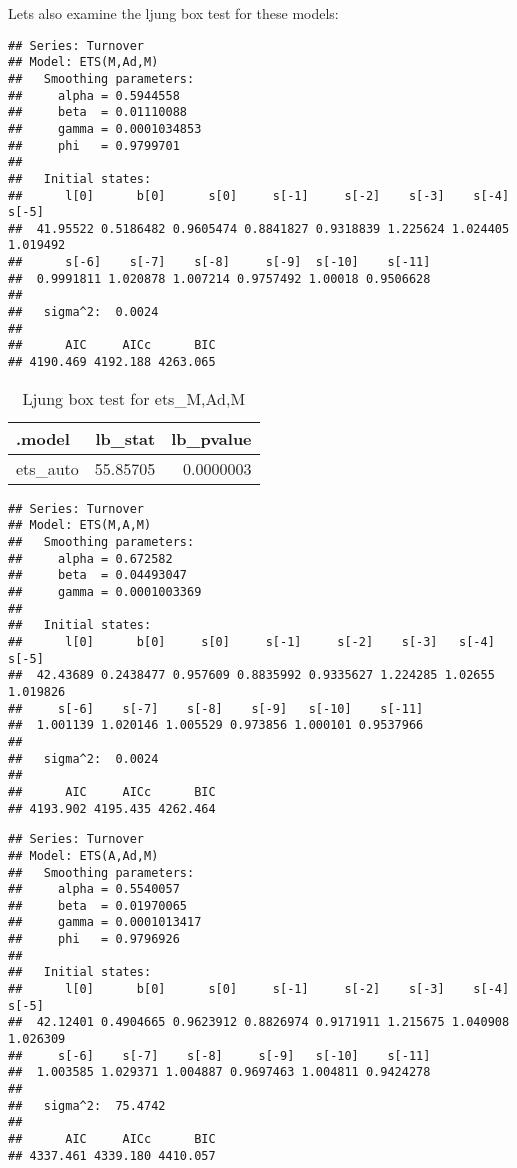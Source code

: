 \documentclass[
]{article}
\begin{document}
Lets also examine the ljung box test for these models:

\begin{verbatim}
## Series: Turnover 
## Model: ETS(M,Ad,M) 
##   Smoothing parameters:
##     alpha = 0.5944558 
##     beta  = 0.01110088 
##     gamma = 0.0001034853 
##     phi   = 0.9799701 
## 
##   Initial states:
##      l[0]      b[0]      s[0]     s[-1]     s[-2]    s[-3]    s[-4]    s[-5]
##  41.95522 0.5186482 0.9605474 0.8841827 0.9318839 1.225624 1.024405 1.019492
##      s[-6]    s[-7]    s[-8]     s[-9]  s[-10]    s[-11]
##  0.9991811 1.020878 1.007214 0.9757492 1.00018 0.9506628
## 
##   sigma^2:  0.0024
## 
##      AIC     AICc      BIC 
## 4190.469 4192.188 4263.065
\end{verbatim}

\begin{table}

\caption{\label{tab:unnamed-chunk-8}Ljung box test for ets_M,Ad,M}
\centering
\begin{tabular}[t]{l|r|r}
\hline
.model & lb\_stat & lb\_pvalue\\
\hline
ets\_auto & 55.85705 & 0.0000003\\
\hline
\end{tabular}
\end{table}

\begin{verbatim}
## Series: Turnover 
## Model: ETS(M,A,M) 
##   Smoothing parameters:
##     alpha = 0.672582 
##     beta  = 0.04493047 
##     gamma = 0.0001003369 
## 
##   Initial states:
##      l[0]      b[0]     s[0]     s[-1]     s[-2]    s[-3]   s[-4]    s[-5]
##  42.43689 0.2438477 0.957609 0.8835992 0.9335627 1.224285 1.02655 1.019826
##     s[-6]    s[-7]    s[-8]    s[-9]   s[-10]    s[-11]
##  1.001139 1.020146 1.005529 0.973856 1.000101 0.9537966
## 
##   sigma^2:  0.0024
## 
##      AIC     AICc      BIC 
## 4193.902 4195.435 4262.464
\end{verbatim}

\begin{verbatim}
## Series: Turnover 
## Model: ETS(A,Ad,M) 
##   Smoothing parameters:
##     alpha = 0.5540057 
##     beta  = 0.01970065 
##     gamma = 0.0001013417 
##     phi   = 0.9796926 
## 
##   Initial states:
##      l[0]      b[0]      s[0]     s[-1]     s[-2]    s[-3]    s[-4]    s[-5]
##  42.12401 0.4904665 0.9623912 0.8826974 0.9171911 1.215675 1.040908 1.026309
##     s[-6]    s[-7]    s[-8]     s[-9]   s[-10]    s[-11]
##  1.003585 1.029371 1.004887 0.9697463 1.004811 0.9424278
## 
##   sigma^2:  75.4742
## 
##      AIC     AICc      BIC 
## 4337.461 4339.180 4410.057
\end{verbatim}
\end{document}
